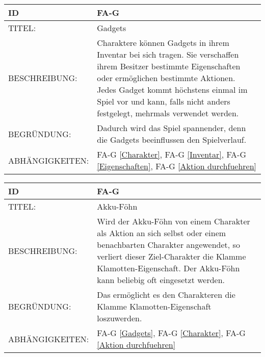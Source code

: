 \begin{tabularx}{16cm}{l|X}
	{table}\label{Gadgets}
	\textbf{ID} & \textbf{FA-G \arabic{table}} \\
	\hline
	TITEL: & Gadgets \\
	\hline
	BESCHREIBUNG: & Charaktere können Gadgets in ihrem Inventar bei sich tragen. Sie verschaffen ihrem Besitzer bestimmte Eigenschaften oder ermöglichen bestimmte Aktionen. Jedes Gadget kommt höchstens einmal im Spiel vor und kann, falls nicht anders festgelegt, mehrmals verwendet werden. \\
	\hline
	BEGRÜNDUNG: & Dadurch wird das Spiel spannender, denn die Gadgets beeinflussen den Spielverlauf. \\
	\hline
	ABHÄNGIGKEITEN: & FA-G \ref{Charakter}, FA-G \ref{Inventar}, FA-G \ref{Eigenschaften}, FA-G \ref{Aktion durchfuehren} \\
\end{tabularx}

\begin{tabularx}{16cm}{l|X}
	{table}\label{Akku-Foehn}
	\textbf{ID} & \textbf{FA-G \arabic{table}} \\
	\hline
	TITEL: & Akku-Föhn \\
	\hline
	BESCHREIBUNG: & Wird der Akku-Föhn von einem Charakter als Aktion an sich selbst oder einem benachbarten Charakter angewendet, so verliert dieser Ziel-Charakter die Klamme Klamotten-Eigenschaft. Der Akku-Föhn kann beliebig oft eingesetzt werden. \\
	\hline
	BEGRÜNDUNG: & Das ermöglicht es den Charakteren die Klamme Klamotten-Eigenschaft loszuwerden.  \\
	\hline
	ABHÄNGIGKEITEN: & FA-G \ref{Gadgets}, FA-G \ref{Charakter}, FA-G \ref{Aktion durchfuehren} \\
\end{tabularx}

